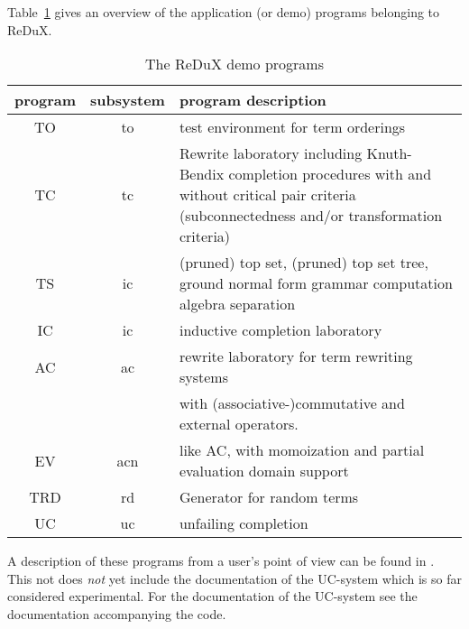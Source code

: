 Table~\ref{ta:dem} gives an overview of the application (or demo) programs
belonging to ReDuX.
\begin{table}
 \centering
 \begin{tabular}{|c|c|p{9.5cm}|}
  \hline
  program & subsystem & program description \\ \hline\hline
   TO & to & test environment for term orderings \\ \hline
   TC & tc & Rewrite laboratory including Knuth-Bendix completion 
             procedures with and without critical pair criteria
             (subconnectedness and/or transformation criteria) \\ \hline
   TS & ic &  (pruned) top set, (pruned) top set tree,
              ground normal form grammar computation 
              algebra separation \\ \hline 
   IC  & ic & inductive completion laboratory \\ \hline
   AC   & ac & rewrite laboratory for term rewriting systems \\
        &    & with (associative-)commutative and
               external operators. \\ \hline
   EV   & acn & like AC, with momoization and partial evaluation domain 
                support \\ \hline
   TRD & rd & Generator for random terms \\ \hline
   UC  & uc & unfailing completion \\ \hline
 \end{tabular}
 \caption{The ReDuX demo programs} \label{ta:dem}
\end{table}
A description of these programs from a user's point of view can be found in
\RUD.
This not does {\em not} yet include the documentation of the UC-system
which is so far considered experimental.
For the documentation of the UC-system see the documentation accompanying
the code.
